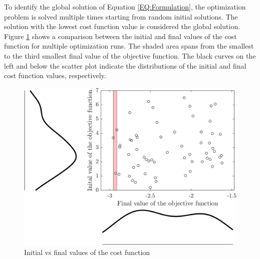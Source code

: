 \documentclass[../Article_Sensitivity_Analsysis.tex]{subfiles}
\begin{document}
	
	\label{CH: Results}
	
	
	To identify the global solution of Equation \ref{EQ:Formulation}, the optimization problem is solved multiple times starting from random initial solutions. The solution with the lowest cost function value is considered the global solution. Figure \ref{fig:scatter} shows a comparison between the initial and final values of the cost function for multiple optimization runs. The shaded area spans from the smallest to the third smallest final value of the objective function. The black curves on the left and below the scatter plot indicate the distributions of the initial and final cost function values, respectively.
	
	\begin{figure}[h!]
		\centering
		\includegraphics[width=\columnwidth]{Figures/Results/scatter.png}	
		\caption{Initial vs final values of the cost function}
		\label{fig:scatter}
	\end{figure}
	
\end{document}
